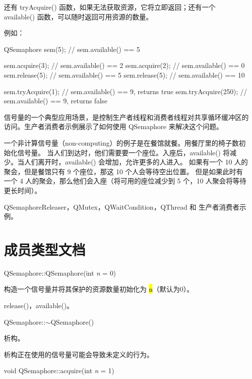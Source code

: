 还有 tryAcquire() 函数，如果无法获取资源，它将立即返回；还有一个 available() 函数，可以随时返回可用资源的数量。

例如：

\begin{cppcode}
QSemaphore sem(5);      // sem.available() == 5

sem.acquire(3);         // sem.available() == 2
sem.acquire(2);         // sem.available() == 0
sem.release(5);         // sem.available() == 5
sem.release(5);         // sem.available() == 10

sem.tryAcquire(1);      // sem.available() == 9, returns true
sem.tryAcquire(250);    // sem.available() == 9, returns false
\end{cppcode}

信号量的一个典型应用场景，是控制生产者线程和消费者线程对共享循环缓冲区的访问。生产者消费者示例展示了如何使用 QSemaphore 来解决这个问题。

一个非计算信号量（non-computing）的例子是在餐馆就餐。用餐厅里的椅子数初始化信号量。
当人们到达时，他们需要要一个座位。入座后，available() 将减少。当人们离开时，available() 会增加，允许更多的人进入。
如果有一个 10 人的聚会，但是餐馆只有 9 个座位，那这 10 个人会等待空出位置。
但是如果此时有一个 4 人的聚会，那么他们会入座（将可用的座位减少到 5 个，10 人聚会将等待更长时间）。

\begin{seeAlso}
QSemaphoreReleaser，QMutex，QWaitCondition，QThread 和 生产者消费者示例。
\end{seeAlso}

\section{成员类型文档}

QSemaphore::QSemaphore(int \emph{n} = 0)

构造一个信号量并将其保护的资源数量初始化为 \hl{n}（默认为0）。

\begin{seeAlso}
release()，available()。
\end{seeAlso}

QSemaphore::$\sim$QSemaphore()

析构。

\begin{warning}
析构正在使用的信号量可能会导致未定义的行为。
\end{warning}

void QSemaphore::acquire(int \emph{n} = 1)

